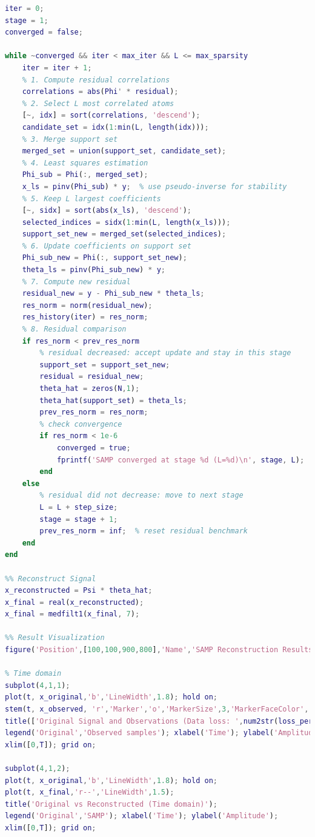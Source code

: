 \documentclass[12pt]{ctexart}
\begin{document}
\begin{lstlisting}[language=Matlab]
%% SAMP
iter = 0;
stage = 1;
converged = false;

while ~converged && iter < max_iter && L <= max_sparsity
    iter = iter + 1;
    % 1. Compute residual correlations
    correlations = abs(Phi' * residual);
    % 2. Select L most correlated atoms
    [~, idx] = sort(correlations, 'descend');
    candidate_set = idx(1:min(L, length(idx)));
    % 3. Merge support set
    merged_set = union(support_set, candidate_set);
    % 4. Least squares estimation
    Phi_sub = Phi(:, merged_set);
    x_ls = pinv(Phi_sub) * y;  % use pseudo-inverse for stability
    % 5. Keep L largest coefficients
    [~, sidx] = sort(abs(x_ls), 'descend');
    selected_indices = sidx(1:min(L, length(x_ls)));
    support_set_new = merged_set(selected_indices);
    % 6. Update coefficients on support set
    Phi_sub_new = Phi(:, support_set_new);
    theta_ls = pinv(Phi_sub_new) * y;
    % 7. Compute new residual
    residual_new = y - Phi_sub_new * theta_ls;
    res_norm = norm(residual_new);
    res_history(iter) = res_norm;
    % 8. Residual comparison
    if res_norm < prev_res_norm
        % residual decreased: accept update and stay in this stage
        support_set = support_set_new;
        residual = residual_new;
        theta_hat = zeros(N,1);
        theta_hat(support_set) = theta_ls;
        prev_res_norm = res_norm;
        % check convergence
        if res_norm < 1e-6
            converged = true;
            fprintf('SAMP converged at stage %d (L=%d)\n', stage, L);
        end
    else
        % residual did not decrease: move to next stage
        L = L + step_size;
        stage = stage + 1;
        prev_res_norm = inf;  % reset residual benchmark
    end
end

%% Reconstruct Signal
x_reconstructed = Psi * theta_hat;
x_final = real(x_reconstructed);
x_final = medfilt1(x_final, 7);

%% Result Visualization
figure('Position',[100,100,900,800],'Name','SAMP Reconstruction Results');

% Time domain
subplot(4,1,1);
plot(t, x_original,'b','LineWidth',1.8); hold on;
stem(t, x_observed, 'r','Marker','o','MarkerSize',3,'MarkerFaceColor','r');
title(['Original Signal and Observations (Data loss: ',num2str(loss_percentage*100),'%, Noise level: ',num2str(noise_level),')']);
legend('Original','Observed samples'); xlabel('Time'); ylabel('Amplitude');
xlim([0,T]); grid on;

subplot(4,1,2);
plot(t, x_original,'b','LineWidth',1.8); hold on;
plot(t, x_final,'r--','LineWidth',1.5);
title('Original vs Reconstructed (Time domain)');
legend('Original','SAMP'); xlabel('Time'); ylabel('Amplitude');
xlim([0,T]); grid on;


\end{lstlisting}
\end{document}
